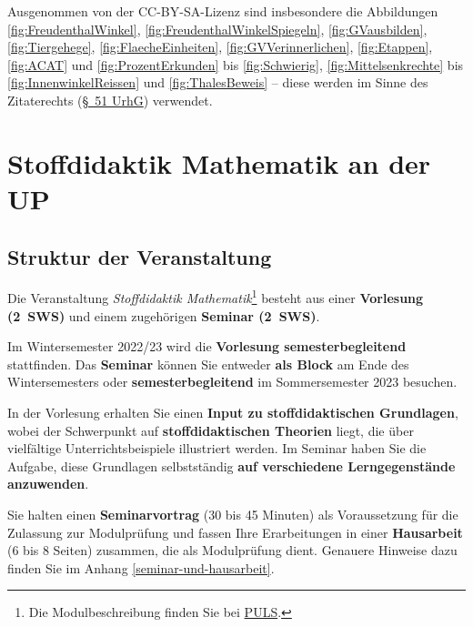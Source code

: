 \documentclass[
]{scrbook}
\theoremstyle{definition}
\theoremstyle{definition}
\theoremstyle{definition}
\theoremstyle{definition}
\theoremstyle{remark}
\begin{document}
Ausgenommen von der CC-BY-SA-Lizenz sind insbesondere die Abbildungen \ref{fig:FreudenthalWinkel}, \ref{fig:FreudenthalWinkelSpiegeln}, \ref{fig:GVausbilden}, \ref{fig:Tiergehege}, \ref{fig:FlaecheEinheiten}, \ref{fig:GVVerinnerlichen}, \ref{fig:Etappen}, \ref{fig:ACAT} und \ref{fig:ProzentErkunden} bis \ref{fig:Schwierig}, \ref{fig:Mittelsenkrechte} bis \ref{fig:InnenwinkelReissen} und \ref{fig:ThalesBeweis} -- diese werden im Sinne des Zitaterechts (\href{https://www.gesetze-im-internet.de/urhg/__51.html}{§~51 UrhG}) verwendet.

\hypertarget{stoffdidaktik-mathematik-an-der-up}{%
\chapter*{Stoffdidaktik Mathematik an der UP}\label{stoffdidaktik-mathematik-an-der-up}}

\hypertarget{struktur-der-veranstaltung}{%
\section*{Struktur der Veranstaltung}\label{struktur-der-veranstaltung}}

Die Veranstaltung \emph{Stoffdidaktik Mathematik}\footnote{Die Modulbeschreibung finden Sie bei \href{https://puls.uni-potsdam.de/qisserver/rds?state=verpublish\&status=init\&vmfile=no\&moduleCall=modulansicht\&publishConfFile=modulverwaltung\&publishSubDir=up/modulbearbeiter\&\&modul.modul_id=3155\&menuid=\&topitem=Modulbeschreibung\&subitem=}{PULS}.} besteht aus einer \textbf{Vorlesung (2~SWS)} und einem zugehörigen \textbf{Seminar (2~SWS)}.

Im Wintersemester 2022/23 wird die \textbf{Vorlesung semesterbegleitend} stattfinden. Das \textbf{Seminar} können Sie entweder \textbf{als Block} am Ende des Wintersemesters oder \textbf{semesterbegleitend} im Sommersemester 2023 besuchen.

In der Vorlesung erhalten Sie einen \textbf{Input zu stoffdidaktischen Grundlagen}, wobei der Schwerpunkt auf \textbf{stoffdidaktischen Theorien} liegt, die über vielfältige Unterrichtsbeispiele illustriert werden. Im Seminar haben Sie die Aufgabe, diese Grundlagen selbstständig \textbf{auf verschiedene Lerngegenstände anzuwenden}.

Sie halten einen \textbf{Seminarvortrag} (30 bis 45 Minuten) als Voraussetzung für die Zulassung zur Modulprüfung und fassen Ihre Erarbeitungen in einer \textbf{Hausarbeit} (6 bis 8 Seiten) zusammen, die als Modulprüfung dient. Genauere Hinweise dazu finden Sie im Anhang \ref{seminar-und-hausarbeit}.
\end{document}
